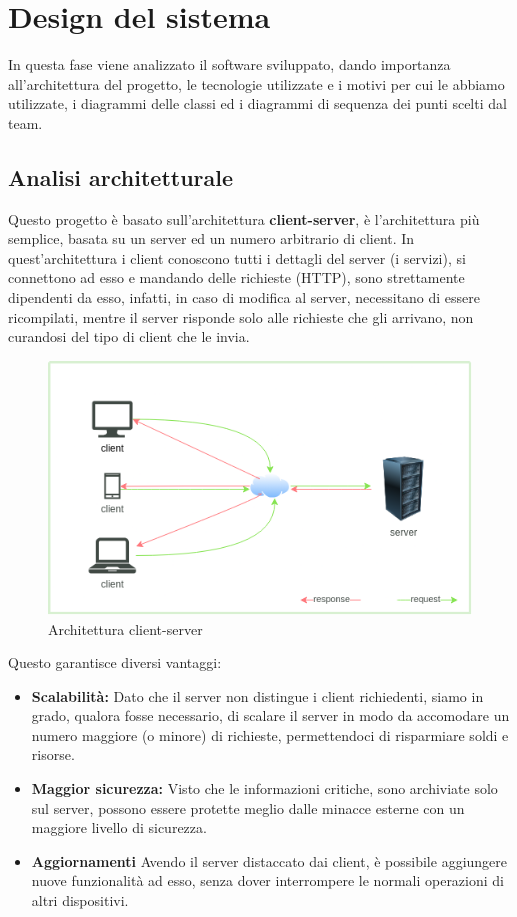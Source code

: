 \section{Design del sistema}
In questa fase viene analizzato il software sviluppato, dando importanza all'architettura del progetto, le tecnologie utilizzate e i motivi per cui le abbiamo utilizzate, i diagrammi delle classi ed i diagrammi di sequenza dei punti scelti dal team.
\subsection{Analisi architetturale}
Questo progetto è basato sull'architettura \textbf{client-server}, è l'architettura più semplice, basata su un server ed un numero arbitrario di client. In quest'architettura i client conoscono tutti i dettagli del server (i servizi), si connettono ad esso e mandando delle richieste (HTTP), sono strettamente dipendenti da esso, infatti, in caso di modifica al server, necessitano di essere ricompilati, mentre il server risponde solo alle richieste che gli arrivano, non curandosi del tipo di client che le invia. 
\begin{figure}[H]
  \centering
  \includegraphics[scale=0.8]{img/architectureDesign/Architecture.png}
  \caption{Architettura client-server}
\end{figure}
Questo garantisce diversi vantaggi:
\begin{itemize}
  \item \textbf{Scalabilità:} Dato che il server non distingue i client richiedenti, siamo in grado, qualora fosse necessario, di scalare il server in modo da accomodare un numero maggiore (o minore) di richieste, permettendoci di risparmiare soldi e risorse.
  \item \textbf{Maggior sicurezza:} Visto che le informazioni critiche, sono archiviate solo sul server, possono essere protette meglio dalle minacce esterne con un maggiore livello di sicurezza.
  \item \textbf{Aggiornamenti} Avendo il server distaccato dai client, è possibile aggiungere nuove funzionalità ad esso, senza dover interrompere le normali operazioni di altri dispositivi.
\end{itemize}
\newpage
